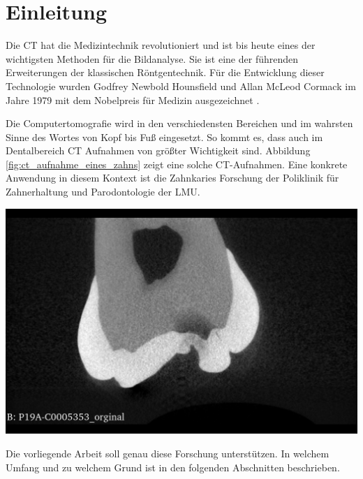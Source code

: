 \chapter{Einleitung}
\label{chap:einleitung} Die \ac{CT} hat die Medizintechnik revolutioniert und
ist bis heute eines der wichtigsten Methoden für die Bildanalyse. Sie ist eine der
führenden Erweiterungen der klassischen Röntgentechnik. Für die Entwicklung
dieser Technologie wurden Godfrey Newbold Hounsfield und Allan McLeod Cormack im
Jahre 1979 mit dem Nobelpreis für Medizin ausgezeichnet \citep[Seite12]{handels2000}.

\begin{minipage}{0.45\textwidth}
	Die Computertomografie wird in den verschiedensten Bereichen und im wahrsten Sinne
	des Wortes von Kopf bis Fuß eingesetzt. So kommt es, dass auch im Dentalbereich
	\ac{CT} Aufnahmen von größter Wichtigkeit sind. Abbildung \ref{fig:ct_aufnahme_eines_zahns}
	zeigt eine solche \ac{CT}-Aufnahmen. Eine konkrete Anwendung in diesem Kontext
	ist die Zahnkaries Forschung der Poliklinik für Zahnerhaltung und Parodontologie
	der \ac{LMU}.
\end{minipage}
\hfill
\begin{minipage}{0.45\textwidth}
	\centering
	\includegraphics[scale=0.2, width=\textwidth]{img/micro_ct_orginal.jpg}
	 \label{fig:ct_aufnahme_eines_zahns}
\end{minipage}

Die vorliegende Arbeit soll genau diese Forschung unterstützen. In welchem
Umfang und zu welchem Grund ist in den folgenden Abschnitten beschrieben.

